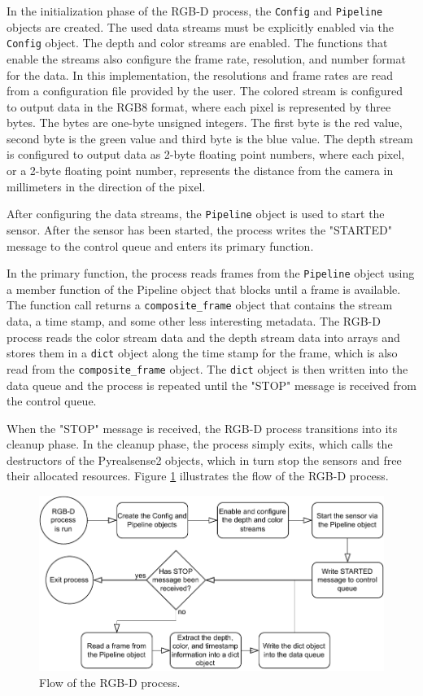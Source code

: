 In the initialization phase of the RGB-D process, the \texttt{Config} and \texttt{Pipeline} objects are created.
The used data streams must be explicitly enabled via the \texttt{Config} object.
The depth and color streams are enabled.
The functions that enable the streams also configure the frame rate, resolution, and number format for the data.
In this implementation, the resolutions and frame rates are read from a configuration file provided by the user.
The colored stream is configured to output data in the RGB8 format, where each pixel is represented by three bytes.
The bytes are one-byte unsigned integers. The first byte is the red value, second byte is the green value and third byte is the blue value.
The depth stream is configured to output data as 2-byte floating point numbers,
where each pixel, or a 2-byte floating point number, represents the distance from the camera in millimeters in the direction of the pixel.

After configuring the data streams, the \texttt{Pipeline} object is used to start the sensor.
After the sensor has been started, the process writes the "STARTED" message to the control queue and enters its primary function.

In the primary function, the process reads frames from the \texttt{Pipeline} object using a member function of the Pipeline object that blocks until a frame is available.
The function call returns a \texttt{composite\_frame} object that contains the stream data, a time stamp, and some other less interesting metadata.
The RGB-D process reads the color stream data and the depth stream data into arrays and stores them in a \texttt{dict} object along the time stamp for the frame,
which is also read from the \texttt{composite\_frame} object.
The \texttt{dict} object is then written into the data queue and the process is repeated until the "STOP" message is received from the control queue.

When the "STOP" message is received,
the RGB-D process transitions into its cleanup phase.
In the cleanup phase, the process simply exits,
which calls the destructors of the Pyrealsense2 objects,
which in turn stop the sensors and free their allocated resources.
Figure \ref{fig:3-rgbd-flowchart} illustrates the flow of the RGB-D process.

\begin{figure}
    \centering
    \includegraphics{fig/3/rgbd-flowchart.pdf}
    \caption{Flow of the RGB-D process.}
    \label{fig:3-rgbd-flowchart}
\end{figure}


